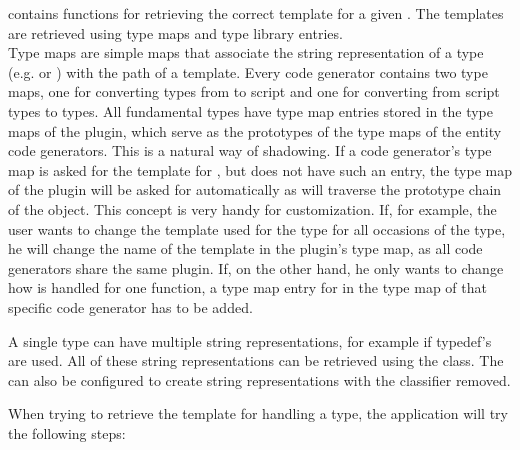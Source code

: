  contains functions for retrieving the correct template for a given . The templates are retrieved using type maps and type library entries.\\
Type maps are simple maps that associate the string representation of a type (e.g.  or ) with the path of a template. Every code generator contains two type maps, one for converting types from  to script and one for converting from script types to  types. All fundamental  types have type map entries stored in the type maps of the plugin, which serve as the  prototypes of the type maps of the entity code generators. This is a natural way of shadowing. If a code generator's type map is asked for the template for , but does not have such an entry, the type map of the plugin will be asked for  automatically as  will traverse the prototype chain of the object. This concept is very handy for customization. If, for example, the user wants to change the template used for the  type for all occasions of the type, he will change the name of the template in the plugin's type map, as all code generators share the same plugin. If, on the other hand, he only wants to change how  is handled for one function, a type map entry for  in the type map of that specific code generator has to be added.

A single type can have multiple string representations, for example if typedef's are used. All of these string representations can be retrieved using the  class. The  can also be configured to create string representations with the  classifier removed.

When trying to retrieve the template for handling a type, the application will try the following steps:

